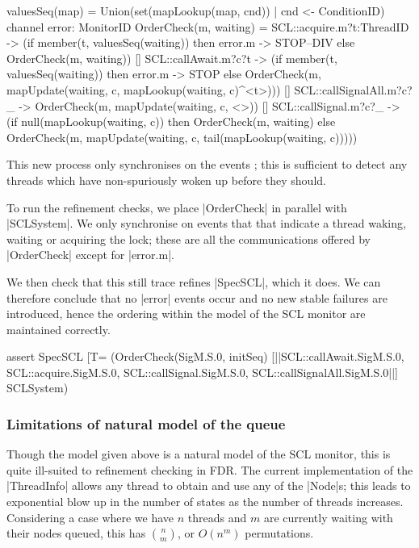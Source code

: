 \begin{cspm}
valuesSeq(map) = Union({set(mapLookup(map, cnd)) | cnd <- ConditionID})
channel error: MonitorID
OrderCheck(m, waiting) = 
      SCL::acquire.m?t:ThreadID -> 
      (if member(t, valuesSeq(waiting)) then error.m -> STOP--DIV
        else OrderCheck(m, waiting))
  [] SCL::callAwait.m?c?t -> 
      (if member(t, valuesSeq(waiting)) then error.m -> STOP
        else OrderCheck(m, mapUpdate(waiting, c, mapLookup(waiting, c)^<t>)))
  [] SCL::callSignalAll.m?c?_ -> 
        OrderCheck(m, mapUpdate(waiting, c, <>))
  [] SCL::callSignal.m?c?_ -> 
      (if null(mapLookup(waiting, c)) then OrderCheck(m, waiting)
        else OrderCheck(m, mapUpdate(waiting, c, 
                                    tail(mapLookup(waiting, c)))))
\end{cspm}

This new process only synchronises on the events ; this is sufficient to detect any threads which have non-spuriously woken up before they should.

To run the refinement checks, we place |OrderCheck| in parallel with |SCLSystem|. We only synchronise on events that that indicate a thread waking, waiting or acquiring the lock; these are all the communications offered by |OrderCheck| except for |error.m|. 

We then check that this still trace refines |SpecSCL|, which it does. We can therefore conclude that no |error| events occur and no new stable failures are introduced, hence the ordering within the model of the SCL monitor are maintained correctly.

\begin{cspm}
assert SpecSCL [T= (OrderCheck(SigM.S.0, initSeq) 
                     [|{|SCL::callAwait.SigM.S.0,
                         SCL::acquire.SigM.S.0,
                         SCL::callSignal.SigM.S.0,
                         SCL::callSignalAll.SigM.S.0|}|] SCLSystem)
\end{cspm}

\subsubsection{Limitations of natural model of the queue}

Though the model given above is a natural model of the SCL monitor, this is quite ill-suited to refinement checking in FDR. The current implementation of the |ThreadInfo| allows any thread to obtain and use any of the |Node|s; this leads to exponential blow up in the number of states as the number of threads increases. Considering a case where we have $n$ threads and $m$ are currently waiting with their nodes queued, this has $n\choose{m}$, or $O(n^{m})$ permutations.

